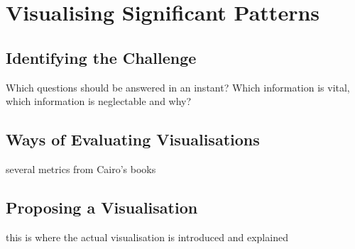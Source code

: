 
\chapter{Visualising Significant Patterns}
\section{Identifying the Challenge}
Which questions should be answered in an instant? Which information is vital, which information is neglectable and why?

\section{Ways of Evaluating Visualisations}
several metrics from Cairo's books

\section{Proposing a Visualisation} %
this is where the actual visualisation is introduced and explained
